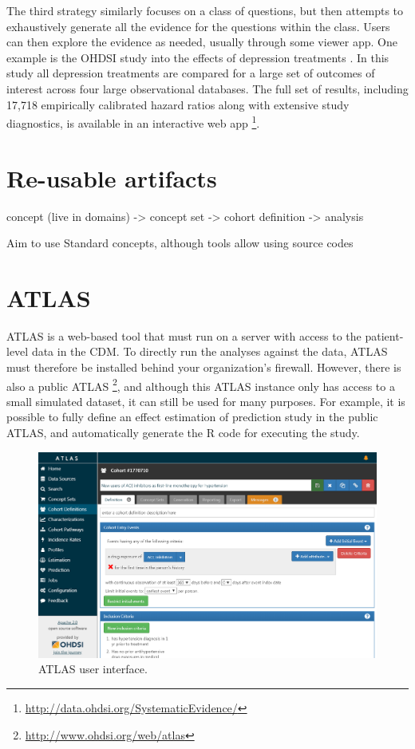 \documentclass[11pt]{book}
\let\rmarkdownfootnote\footnote%
\def\footnote{\protect\rmarkdownfootnote}
\begin{document}
The third strategy similarly focuses on a class of questions, but then
attempts to exhaustively generate all the evidence for the questions
within the class. Users can then explore the evidence as needed, usually
through some viewer app. One example is the OHDSI study into the effects
of depression treatments \citep{schuemie_2018b}. In this study all
depression treatments are compared for a large set of outcomes of
interest across four large observational databases. The full set of
results, including 17,718 empirically calibrated hazard ratios along
with extensive study diagnostics, is available in an interactive web app
\footnote{\url{http://data.ohdsi.org/SystematicEvidence/}}.

\section{Re-usable artifacts}\label{re-usable-artifacts}

concept (live in domains) -\textgreater{} concept set -\textgreater{}
cohort definition -\textgreater{} analysis

Aim to use Standard concepts, although tools allow using source codes

\section{ATLAS}\label{atlas}

ATLAS is a web-based tool that must run on a server with access to the
patient-level data in the CDM. To directly run the analyses against the
data, ATLAS must therefore be installed behind your organization's
firewall. However, there is also a public ATLAS \footnote{\url{http://www.ohdsi.org/web/atlas}},
and although this ATLAS instance only has access to a small simulated
dataset, it can still be used for many purposes. For example, it is
possible to fully define an effect estimation of prediction study in the
public ATLAS, and automatically generate the R code for executing the
study.

\begin{figure}

{\centering \includegraphics[width=1\linewidth]{images/OhdsiAnalyticsTools/atlas} 

}

\caption{ATLAS user interface.}\label{fig:atlas}
\end{figure}
\end{document}
